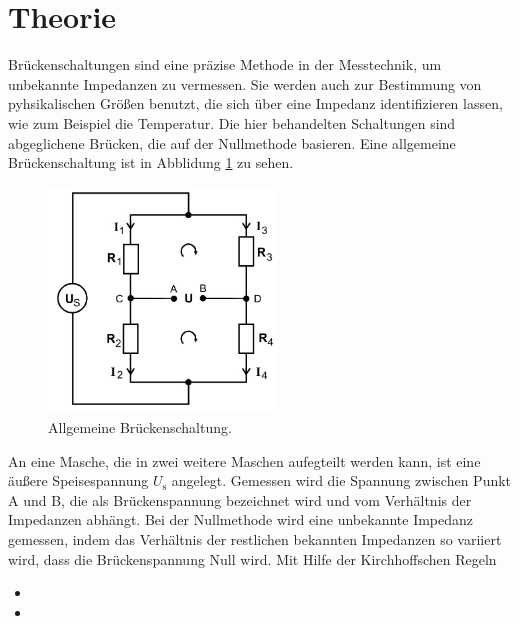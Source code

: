 \section{Theorie}
\label{sec:Theorie}

Brückenschaltungen sind eine präzise Methode in der Messtechnik, um unbekannte Impedanzen zu vermessen.
Sie werden auch zur Bestimmung von pyhsikalischen Größen benutzt, die sich über eine Impedanz identifizieren lassen, wie zum Beispiel die Temperatur.
Die hier behandelten Schaltungen sind abgeglichene Brücken, die auf der Nullmethode basieren.
Eine allgemeine Brückenschaltung ist in Abblidung \ref{fig:Schaltung1} zu sehen.
\begin{figure}
  \includegraphics[height=6cm]{data/Schaltung1.jpg}
  \centering
  \caption{Allgemeine Brückenschaltung.}
  \label{fig:Schaltung1}
\end{figure}
An eine Masche, die in zwei weitere Maschen aufegteilt werden kann, ist eine äußere Speisespannung $U_{\text{s}}$ angelegt.
Gemessen wird die Spannung zwischen Punkt A und B, die als Brückenspannung bezeichnet wird und vom Verhältnis der Impedanzen abhängt.
Bei der Nullmethode wird eine unbekannte Impedanz gemessen, indem das Verhältnis der restlichen bekannten Impedanzen so variiert wird, dass die Brückenspannung Null wird.
Mit Hilfe der Kirchhoffschen Regeln
\begin{itemize}
  \item {}
  \item {}
\end{itemize}
